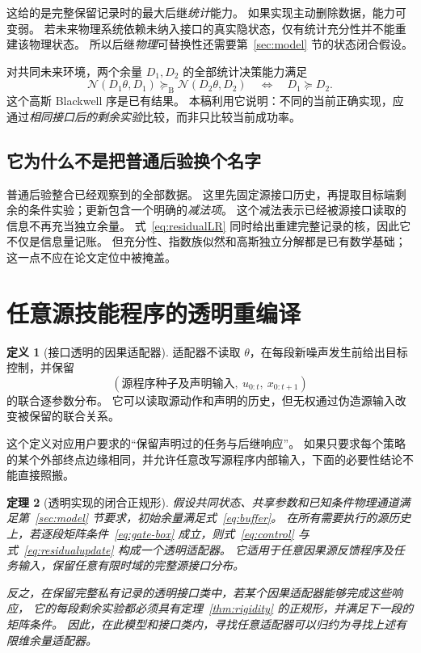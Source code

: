 \documentclass[UTF8,fontset=fandol,11pt,a4paper]{ctexart}
\newcommand{\N}{\mathcal N}
\newtheorem{theorem}{定理}[section]
\theoremstyle{definition}
\newtheorem{definition}[theorem]{定义}
\theoremstyle{remark}
\numberwithin{equation}{section}
\begin{document}
这给的是完整保留记录时的最大后继\emph{统计}能力。
如果实现主动删除数据，能力可变弱。
若未来物理系统依赖未纳入接口的真实隐状态，仅有统计充分性并不能重建该物理状态。
所以后继\emph{物理}可替换性还需要第~\ref{sec:model} 节的状态闭合假设。

对共同未来环境，两个余量 $D_1,D_2$ 的全部统计决策能力满足
\begin{equation}
 \N(D_1\theta,D_1)\succeq_{\mathrm B}\N(D_2\theta,D_2)
 \quad\Longleftrightarrow\quad D_1\succeq D_2.
\end{equation}
这个高斯 Blackwell 序是已有结果\cite{xiao}。
本稿利用它说明：不同的当前正确实现，应通过\emph{相同接口后的剩余实验}比较，而非只比较当前成功率。

\subsection{它为什么不是把普通后验换个名字}
普通后验整合已经观察到的全部数据。
这里先固定源接口历史，再提取目标端剩余的条件实验；更新包含一个明确的\emph{减法项}。
这个减法表示已经被源接口读取的信息不再充当独立余量。
式~\eqref{eq:residualLR} 同时给出重建完整记录的核，因此它不仅是信息量记账。
但充分性、指数族似然和高斯独立分解都是已有数学基础\cite{thinning}；这一点不应在论文定位中被掩盖。

\section{任意源技能程序的透明重编译}
\label{sec:transparent}

\begin{definition}[接口透明的因果适配器]
适配器不读取 $\theta$，在每段新噪声发生前给出目标控制，并保留
\[
 (\text{源程序种子及声明输入},\ u_{0:t},\ x_{0:t+1})
\]
的联合逐参数分布。
它可以读取源动作和声明的历史，但无权通过伪造源输入改变被保留的联合关系。
\end{definition}
这个定义对应用户要求的“保留声明过的任务与后继响应”。
如果只要求每个策略的某个外部终点边缘相同，并允许任意改写源程序内部输入，下面的必要性结论不能直接照搬。

\begin{theorem}[透明实现的闭合正规形]
\label{thm:dynamic}
假设共同状态、共享参数和已知条件物理通道满足第~\ref{sec:model} 节要求，初始余量满足式~\eqref{eq:buffer}。
在所有需要执行的源历史上，若逐段矩阵条件~\eqref{eq:gate-box} 成立，则式~\eqref{eq:control} 与式~\eqref{eq:residualupdate} 构成一个透明适配器。
它适用于任意因果源反馈程序及任务输入，保留任意有限时域的完整源接口分布。

反之，在保留完整私有记录的透明接口类中，若某个因果适配器能够完成这些响应，
它的每段剩余实验都必须具有定理~\ref{thm:rigidity} 的正规形，并满足下一段的矩阵条件。
因此，在此模型和接口类内，寻找任意适配器可以归约为寻找上述有限维余量适配器。
\end{theorem}
\end{document}
